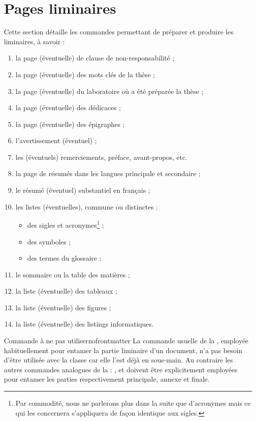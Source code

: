 \chapter{Pages liminaires}\label{cha:liminaires}

Cette section détaille les commandes permettant de préparer et produire les
\glspl{liminaire}, à savoir :
\begin{enumerate}
\item la page (éventuelle) de clause de non-responsabilité ;
\item la page (éventuelle) des mots clés de la thèse ;
\item la page (éventuelle) du laboratoire où a été préparée la thèse ;
\item la page (éventuelle) des dédicaces ;
\item la page (éventuelle) des épigraphes ;
\item l'avertissement (éventuel) ;
\item les (éventuels) remerciements, préface, avant-propos, etc.
\item la page de résumés dans les langues principale et secondaire ;
\item le résumé (éventuel) substantiel en français ;
\item les listes (éventuelles), commune ou distinctes :
  \begin{itemize}
  \item des sigles et acronymes\footnote{Par commodité, nous ne parlerons plus
      dans la suite que d'acronymes mais ce qui les concernera s'appliquera de
      façon identique aux sigles.} ;
  \item des symboles ;
  \item des termes du glossaire ;
  \end{itemize}
\item le sommaire ou la table des matières ;
\item la liste (éventuelle) des tableaux ;
\item la liste (éventuelle) des figures ;
\item la liste (éventuelle) des listings informatiques.
\end{enumerate}

\begin{dbremark}{Commande \protect{} à ne pas utiliser}{nofrontmatter}
  La commande  usuelle de la , employée
  habituellement pour entamer la partie liminaire d'un document, n'a pas besoin
  d'être utilisée avec la classe \yatcl{} car elle l'est déjà en sous-main. Au
  contraire les autres commandes analogues de la  :
  ,  et  doivent être
  explicitement employées pour entamer les parties respectivement principale,
  annexe et finale.
\end{dbremark}

